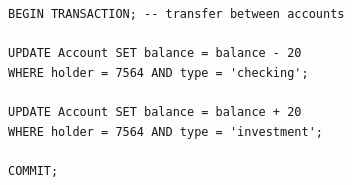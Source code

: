 \newsavebox\UPDATEexample
\begin{lrbox}{\UPDATEexample}
\begin{lstlisting}[style=SQL,linewidth=0.75\textwidth,frame=single]
BEGIN TRANSACTION; -- transfer between accounts

UPDATE Account SET balance = balance - 20
WHERE holder = 7564 AND type = 'checking';

UPDATE Account SET balance = balance + 20
WHERE holder = 7564 AND type = 'investment';

COMMIT;
\end{lstlisting}
\end{lrbox}


%
%


